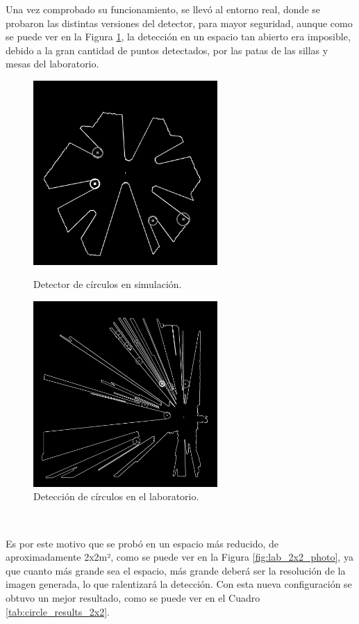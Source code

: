 Una vez comprobado su funcionamiento, se llevó al entorno real, donde se
probaron las distintas versiones del detector, para mayor seguridad, aunque como
se puede ver en la Figura \ref{fig:circle_detection_lab}, la detección en un
espacio tan abierto era imposible, debido a la gran cantidad de puntos
detectados, por las patas de las sillas y mesas del laboratorio.

\begin{figure}[h!]
  \centering
  \begin{minipage}{0.45\textwidth}
    \centering
    \includegraphics[width=7cm]{figs/circle_detection_sim}
    \caption{Detector de círculos en simulación.}
    \label{fig:circle_detection_sim}
  \end{minipage}
  \hfill
  \begin{minipage}{0.45\textwidth}
    \centering
    \includegraphics[width=7cm]{figs/circle_detection_lab}
    \caption{Detección de círculos en el laboratorio.}
    \label{fig:circle_detection_lab}
  \end{minipage}
\end{figure}\

Es por este motivo que se probó en un espacio más reducido, de aproximadamente
2x2m², como se puede ver en la Figura \ref{fig:lab_2x2_photo}, ya que cuanto más
grande sea el espacio, más grande deberá ser la resolución de la imagen
generada, lo que ralentizará la detección.
Con esta nueva configuración se obtuvo un mejor resultado, como se puede ver en
el Cuadro \ref{tab:circle_results_2x2}.

